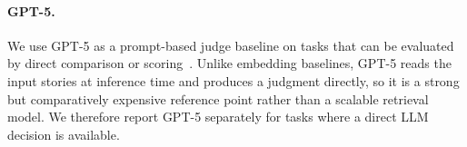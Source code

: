 \paragraph{GPT-5.}
We use GPT-5 as a prompt-based judge baseline on tasks that can be evaluated by direct comparison or scoring~\cite{openai2025gpt5}. Unlike embedding baselines, GPT-5 reads the input stories at inference time and produces a judgment directly, so it is a strong but comparatively expensive reference point rather than a scalable retrieval model. We therefore report GPT-5 separately for tasks where a direct LLM decision is available.
